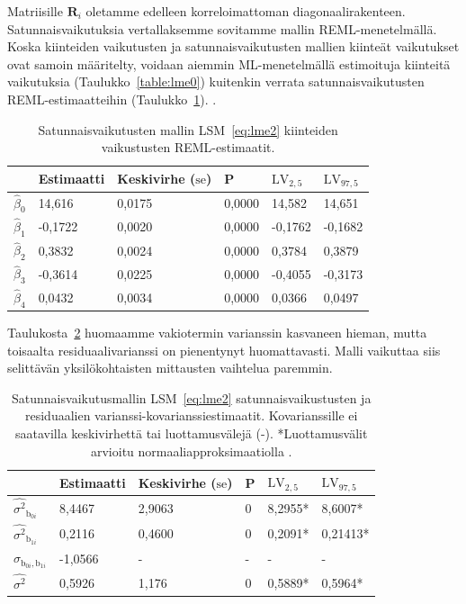 \documentclass[finnish]{docopts}
\begin{document}
Matriisille $\bm{R}_i$ oletamme edelleen korreloimattoman diagonaalirakenteen.\\

Satunnaisvaikutuksia vertallaksemme sovitamme mallin REML-menetelmällä. Koska kiinteiden vaikutusten ja satunnaisvaikutusten mallien kiinteät vaikutukset ovat samoin määritelty, voidaan aiemmin ML-menetelmällä estimoituja kiinteitä vaikutuksia (Taulukko~\ref{table:lme0}) kuitenkin verrata satunnaisvaikutusten REML-estimaatteihin (Taulukko~\ref{table:lme2}). \citep{west14}.

\begin{table}[H]
\centering
\begin{tabular}{llllll}
\toprule
  & Estimaatti & Keskivirhe ($\text{se}$) & P & $\text{LV}_{2,5}$ & $\text{LV}_{97,5}$\\
\midrule
$\hat{\beta}_0$ & 14,616 & 0,0175 & 0,0000 & 14,582 & 14,651\\
$\hat{\beta}_1$ & -0,1722 & 0,0020 & 0,0000 & -0,1762 & -0,1682\\
$\hat{\beta}_2$ & 0,3832 & 0,0024 & 0,0000 & 0,3784 & 0,3879\\
$\hat{\beta}_3$ & -0,3614 & 0,0225 & 0,0000 & -0,4055 & -0,3173\\
$\hat{\beta}_4$ & 0,0432 & 0,0034 & 0,0000 & 0,0366 & 0,0497\\
\bottomrule
\end{tabular}
\caption{Satunnaisvaikutusten mallin LSM~\ref{eq:lme2} kiinteiden vaikustusten REML-estimaatit.}
\label{table:lme2}
\end{table}

Taulukosta~\ref{table:lme3} huomaamme vakiotermin varianssin kasvaneen hieman, mutta toisaalta residuaalivarianssi on pienentynyt huomattavasti. Malli vaikuttaa siis selittävän yksilökohtaisten mittausten vaihtelua paremmin.\\

\begin{table}[H]
\centering
\begin{tabular}{llllll}
\toprule
  & Estimaatti & Keskivirhe ($\text{se}$) & P & $\text{LV}_{2,5}$ & $\text{LV}_{97,5}$\\
\midrule
$\hat{\sigma^2}_{\text{b}_{0i}}$ & 8,4467 & 2,9063 & 0 & 8,2955* & 8,6007*\\
$\hat{\sigma^2}_{\text{b}_{1i}}$ & 0,2116 & 0,4600 & 0 & 0,2091* & 0,21413*\\
$\hat{\sigma}_{\text{b}_{0i}, \text{b}_{1i}}$ & -1,0566 & - & - & - & -\\
\addlinespace
$\hat{\sigma^2}$ & 0,5926 & 1,176 & 0 & 0,5889* & 0,5964*\\
\bottomrule
\end{tabular}
\caption{Satunnaisvaikutusmallin LSM~\ref{eq:lme2} satunnaisvaikustusten ja residuaalien varianssi-kovarianssiestimaatit. Kovarianssille ei saatavilla keskivirhettä tai luottamusvälejä (-). *Luottamusvälit arvioitu normaaliapproksimaatiolla \citep{pinheiro00}.}
\label{table:lme3}
\end{table}
\end{document}
